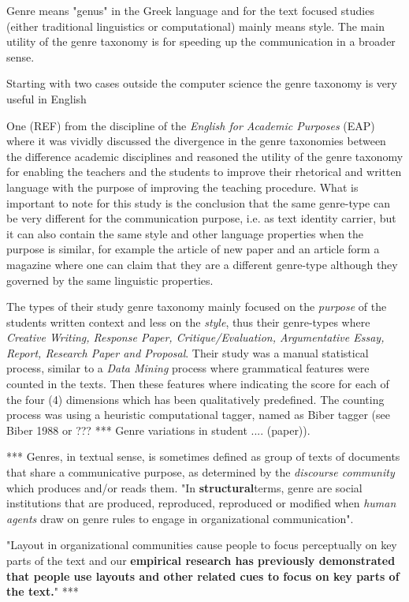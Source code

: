 Genre means "genus" in the Greek language and for the text focused studies (either traditional linguistics or computational) mainly means style. The main utility of the genre taxonomy is for speeding up the communication in a broader sense. 

Starting with two cases outside the computer science the genre taxonomy is very useful in English 

One (REF) from the discipline of the \textit{English for Academic Purposes} (EAP) where it was vividly discussed the divergence in the genre taxonomies between the difference academic disciplines and reasoned the utility of the genre taxonomy for enabling the teachers and the students to improve their rhetorical and written language with the purpose of improving the teaching procedure. What is important to note for this study is the conclusion that the same genre-type can be very different for the communication purpose, i.e. as text identity carrier, but it can also contain the same style and other language properties when the purpose is similar, for example the article of new paper and an article form a magazine where one can claim that they are a different genre-type although they governed by the same linguistic properties.

The types of their study genre taxonomy mainly focused on the \textit{purpose} of the students written context and less on the \textit{style}, thus their genre-types where \textit{Creative Writing, Response Paper, Critique/Evaluation, Argumentative Essay, Report, Research Paper and Proposal}. Their study was a manual statistical process, similar to a \textit{Data Mining} process where grammatical features were counted in the texts. Then these features where indicating the score for each of the four (4) dimensions which has been qualitatively predefined. The counting process was using a heuristic computational tagger, named as Biber tagger (see Biber 1988 or ??? *** Genre variations in student .... (paper)).   
  
  ***
Genres, in textual sense, is sometimes defined as group of texts of documents that share a communicative purpose, as determined by the \textit{discourse community} which produces and/or reads them. "In \textbf{structural}terms, genre are social institutions that are produced, reproduced, reproduced or modified when \textit{human agents} draw on genre rules to engage in organizational communication".

"Layout in organizational communities cause people to focus perceptually on key parts of the text and our \textbf{empirical research has previously demonstrated that people use layouts and other related cues to focus on key parts of the text.}"
***


